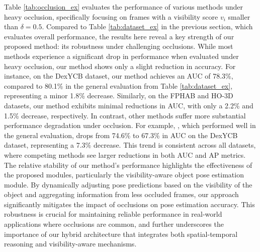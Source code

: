 Table \ref{tab:occlusion_ex} evaluates the performance of various methods under heavy occlusion, specifically focusing on frames with a visibility score \( v_i \) smaller than \( \delta = 0.5 \). Compared to Table \ref{tab:dataset_ex} in the previous section, which evaluates overall performance, the results here reveal a key strength of our proposed method: its robustness under challenging occlusions. While most methods experience a significant drop in performance when evaluated under heavy occlusion, our method shows only a slight reduction in accuracy. For instance, on the DexYCB dataset, our method achieves an AUC of 78.3\%, compared to 80.1\% in the general evaluation from Table \ref{tab:dataset_ex}, representing a minor 1.8\% decrease. Similarly, on the FPHAB and HO-3D datasets, our method exhibits minimal reductions in AUC, with only a 2.2\% and 1.5\% decrease, respectively. In contrast, other methods suffer more substantial performance degradation under occlusion. For example, \cite{wang2023deep}, which performed well in the general evaluation, drops from 74.6\% to 67.3\% in AUC on the DexYCB dataset, representing a 7.3\% decrease. This trend is consistent across all datasets, where competing methods see larger reductions in both AUC and AP metrics. The relative stability of our method's performance highlights the effectiveness of the proposed modules, particularly the visibility-aware object pose estimation module. By dynamically adjusting pose predictions based on the visibility of the object and aggregating information from less occluded frames, our approach significantly mitigates the impact of occlusions on pose estimation accuracy. This robustness is crucial for maintaining reliable performance in real-world applications where occlusions are common, and further underscores the importance of our hybrid architecture that integrates both spatial-temporal reasoning and visibility-aware mechanisms.

\DIFaddbegin \subsection{}

